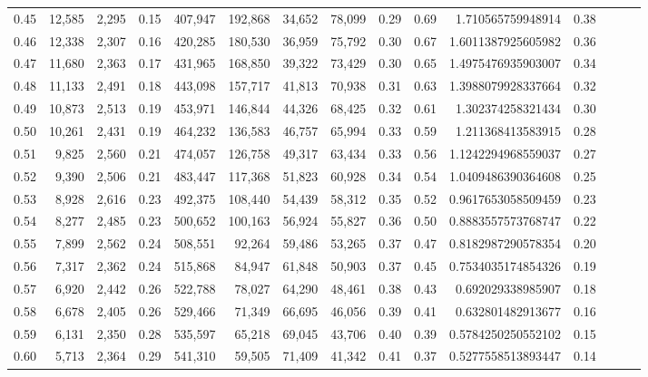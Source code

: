 \begin{tabular}{rrrrrrrrrrrrrrr}
0.45 &  12,585 &  2,295 &  0.15 &  407,947 &  192,868 &   34,652 &   78,099 &  0.29 &  0.69 &     1.710565759948914 &      0.38 \\
0.46 &  12,338 &  2,307 &  0.16 &  420,285 &  180,530 &   36,959 &   75,792 &  0.30 &  0.67 &    1.6011387925605982 &      0.36 \\
0.47 &  11,680 &  2,363 &  0.17 &  431,965 &  168,850 &   39,322 &   73,429 &  0.30 &  0.65 &    1.4975476935903007 &      0.34 \\
0.48 &  11,133 &  2,491 &  0.18 &  443,098 &  157,717 &   41,813 &   70,938 &  0.31 &  0.63 &    1.3988079928337664 &      0.32 \\
0.49 &  10,873 &  2,513 &  0.19 &  453,971 &  146,844 &   44,326 &   68,425 &  0.32 &  0.61 &     1.302374258321434 &      0.30 \\
0.50 &  10,261 &  2,431 &  0.19 &  464,232 &  136,583 &   46,757 &   65,994 &  0.33 &  0.59 &     1.211368413583915 &      0.28 \\
0.51 &   9,825 &  2,560 &  0.21 &  474,057 &  126,758 &   49,317 &   63,434 &  0.33 &  0.56 &    1.1242294968559037 &      0.27 \\
0.52 &   9,390 &  2,506 &  0.21 &  483,447 &  117,368 &   51,823 &   60,928 &  0.34 &  0.54 &    1.0409486390364608 &      0.25 \\
0.53 &   8,928 &  2,616 &  0.23 &  492,375 &  108,440 &   54,439 &   58,312 &  0.35 &  0.52 &    0.9617653058509459 &      0.23 \\
0.54 &   8,277 &  2,485 &  0.23 &  500,652 &  100,163 &   56,924 &   55,827 &  0.36 &  0.50 &    0.8883557573768747 &      0.22 \\
0.55 &   7,899 &  2,562 &  0.24 &  508,551 &   92,264 &   59,486 &   53,265 &  0.37 &  0.47 &    0.8182987290578354 &      0.20 \\
0.56 &   7,317 &  2,362 &  0.24 &  515,868 &   84,947 &   61,848 &   50,903 &  0.37 &  0.45 &    0.7534035174854326 &      0.19 \\
0.57 &   6,920 &  2,442 &  0.26 &  522,788 &   78,027 &   64,290 &   48,461 &  0.38 &  0.43 &     0.692029338985907 &      0.18 \\
0.58 &   6,678 &  2,405 &  0.26 &  529,466 &   71,349 &   66,695 &   46,056 &  0.39 &  0.41 &     0.632801482913677 &      0.16 \\
0.59 &   6,131 &  2,350 &  0.28 &  535,597 &   65,218 &   69,045 &   43,706 &  0.40 &  0.39 &    0.5784250250552102 &      0.15 \\
0.60 &   5,713 &  2,364 &  0.29 &  541,310 &   59,505 &   71,409 &   41,342 &  0.41 &  0.37 &    0.5277558513893447 &      0.14 \\

\end{tabular}

